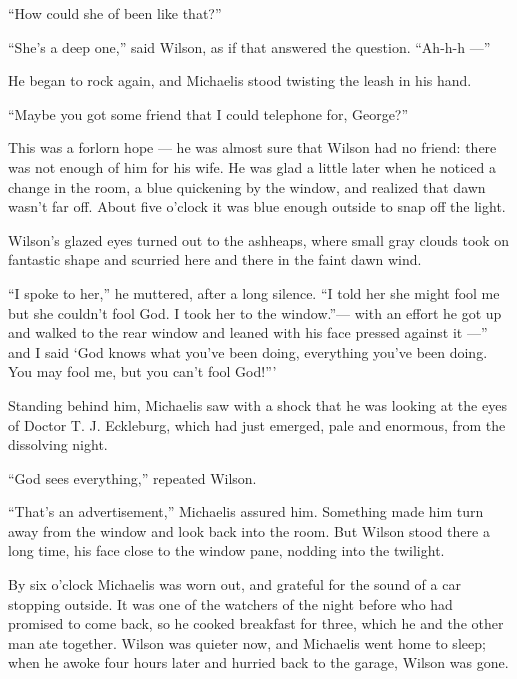 \documentclass{znotebook}
\begin{document}
``How could she of been like that?''

``She's a deep one,'' said Wilson, as if that answered the question. ``Ah-h-h ---''

He began to rock again, and Michaelis stood twisting the leash in his hand.

``Maybe you got some friend that I could telephone for, George?''

This was a forlorn hope ---{} he was almost sure that Wilson had no friend: there was not enough of him for his wife. He was glad a little later when he noticed a change in the room, a blue quickening by the window, and realized that dawn wasn't far off. About five o'clock it was blue enough outside to snap off the light.

Wilson's glazed eyes turned out to the ashheaps, where small gray clouds took on fantastic shape and scurried here and there in the faint dawn wind.

``I spoke to her,'' he muttered, after a long silence. ``I told her she might fool me but she couldn't fool God. I took her to the window.''---{} with an effort he got up and walked to the rear window and leaned with his face pressed against it ---'' and I said ‘God knows what you've been doing, everything you've been doing. You may fool me, but you can't fool God!'''

Standing behind him, Michaelis saw with a shock that he was looking at the eyes of Doctor T. J. Eckleburg, which had just emerged, pale and enormous, from the dissolving night.

``God sees everything,'' repeated Wilson.

``That's an advertisement,'' Michaelis assured him. Something made him turn away from the window and look back into the room. But Wilson stood there a long time, his face close to the window pane, nodding into the twilight.

By six o'clock Michaelis was worn out, and grateful for the sound of a car stopping outside. It was one of the watchers of the night before who had promised to come back, so he cooked breakfast for three, which he and the other man ate together. Wilson was quieter now, and Michaelis went home to sleep; when he awoke four hours later and hurried back to the garage, Wilson was gone.
\end{document}
